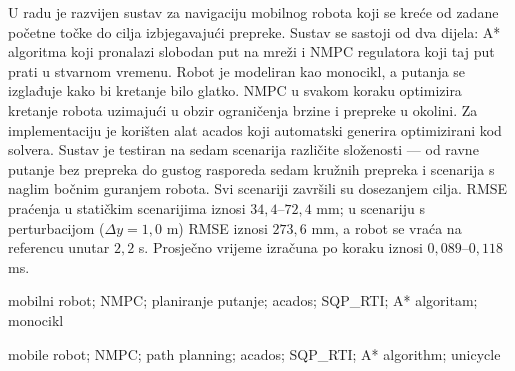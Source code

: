 \documentclass[zavrsnirad]{fer}
\begin{document}

\begin{sazetak}
U radu je razvijen sustav za navigaciju mobilnog robota koji se kreće od zadane početne točke do cilja izbjegavajući prepreke. Sustav se sastoji od dva dijela: A* algoritma koji pronalazi slobodan put na mreži i NMPC regulatora koji taj put prati u stvarnom vremenu. Robot je modeliran kao monocikl, a putanja se izglađuje kako bi kretanje bilo glatko. NMPC u svakom koraku optimizira kretanje robota uzimajući u obzir ograničenja brzine i prepreke u okolini. Za implementaciju je korišten alat acados koji automatski generira optimizirani kod solvera. Sustav je testiran na sedam scenarija različite složenosti --- od ravne putanje bez prepreka do gustog rasporeda sedam kružnih prepreka i scenarija s naglim bočnim guranjem robota. Svi scenariji završili su dosezanjem cilja. RMSE praćenja u statičkim scenarijima iznosi $34{,}4$--$72{,}4$ mm; u scenariju s perturbacijom ($\Delta y = 1{,}0$ m) RMSE iznosi $273{,}6$ mm, a robot se vraća na referencu unutar $2{,}2$ s. Prosječno vrijeme izračuna po koraku iznosi $0{,}089$--$0{,}118$ ms.
\end{sazetak}

\begin{kljucnerijeci}
  mobilni robot; NMPC; planiranje putanje; acados; SQP\_RTI; A* algoritam; monocikl
\end{kljucnerijeci}

\begin{abstract}
This thesis presents a navigation system for a mobile robot that moves from a start position to a goal while avoiding obstacles. The system consists of two parts: an A* algorithm that finds a free path on a grid, and an NMPC controller that follows the path in real time. The robot is modelled as a unicycle and the path is smoothed to ensure fluid motion. At each step, the NMPC optimises the robot's movement while respecting speed limits and obstacle constraints. The implementation uses the acados framework, which automatically generates optimised solver code. The system was tested on seven scenarios of varying difficulty --- from a straight path with no obstacles to a cluttered environment with seven circular obstacles and a scenario with a sudden lateral push. All scenarios ended with the robot successfully reaching the goal. Path tracking RMSE in static scenarios ranges from $34.4$ to $72.4$ mm; in the perturbation scenario, where a $1.0$ m lateral push is applied, RMSE reaches $273.6$ mm with full recovery within $2.2$ s. Average computation time per step is $0.089$--$0.118$ ms.
\end{abstract}

\begin{keywords}
  mobile robot; NMPC; path planning; acados; SQP\_RTI; A* algorithm; unicycle
\end{keywords}
\end{document}
